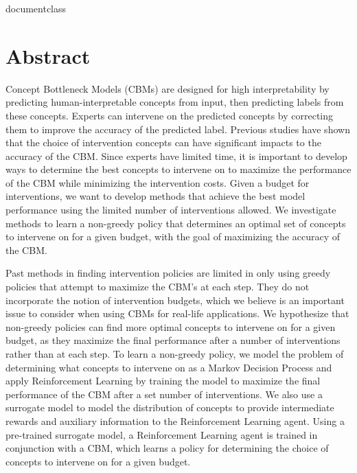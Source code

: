 \csname documentclass

\chapter*{Abstract}




Concept Bottleneck Models (CBMs) are designed for high interpretability by predicting 
human-interpretable concepts from input, 
then predicting labels from these concepts. Experts can intervene on the 
predicted concepts
by correcting them to improve the accuracy of the predicted label. Previous 
studies have shown that the choice of intervention concepts 
can have significant impacts to the accuracy of the CBM.
Since experts have limited time, it is important to develop ways to
determine the best concepts to intervene on to maximize the performance 
of the CBM
while minimizing the intervention costs. Given a budget
for interventions, we want to develop methods that achieve the best model performance
using the limited number of interventions allowed.
We investigate methods to learn a non-greedy policy that determines an optimal set of 
concepts to intervene on
for a given budget, with the goal of maximizing the accuracy of the CBM.

Past methods in finding intervention policies are limited in
only using greedy policies 
that attempt to maximize the CBM's at each step.
They do not incorporate the notion of intervention budgets,
which we believe is an important issue to consider when using CBMs for real-life applications.
We hypothesize that non-greedy policies can find more optimal concepts to intervene on for a 
given budget,
as they maximize the final performance after a number of interventions rather than at each step.
To learn a non-greedy policy, we model the problem of determining what concepts to intervene on
as a Markov Decision Process
and apply Reinforcement Learning by training the model to maximize the final performance of the CBM
after a set number of interventions.
We also use a surrogate model to model the distribution of concepts to provide intermediate rewards and auxiliary information to the
Reinforcement Learning agent.
Using a pre-trained surrogate model, a Reinforcement Learning agent 
is trained in conjunction with a CBM, 
which learns a policy for determining the choice of concepts
to intervene on for a given budget.

